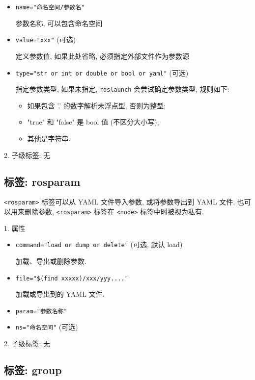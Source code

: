 \documentclass[openany, fontset=windowsold]{ctexbook}
\theoremstyle{kaiti}
\theoremstyle{normal}
\begin{document}
\begin{itemize}
  \item \verb|name="命名空间/参数名"|

  参数名称, 可以包含命名空间

  \item \verb|value="xxx"| (可选)

  定义参数值, 如果此处省略, 必须指定外部文件作为参数源

  \item \verb|type="str or int or double or bool or yaml"| (可选)

  指定参数类型, 如果未指定, \verb|roslaunch| 会尝试确定参数类型, 规则如下:
  \begin{itemize}
    \item 如果包含 '.' 的数字解析未浮点型, 否则为整型;
    \item "true" 和 "false" 是 bool 值 (不区分大小写);
    \item 其他是字符串.
  \end{itemize}
\end{itemize}

2. 子级标签: 无

\subsection{标签: rosparam}

\verb|<rosparam>| 标签可以从 YAML 文件导入参数, 或将参数导出到 YAML 文件, 也可以用来删除参数, \verb|<rosparam>| 标签在 \verb|<node>| 标签中时被视为私有.

1. 属性

\begin{itemize}
  \item \verb|command="load or dump or delete"| (可选, 默认 load)

  加载、导出或删除参数.

  \item \verb|file="$(find xxxxx)/xxx/yyy...."|

  加载或导出到的 YAML 文件.

  \item \verb|param="参数名称"|

  \item \verb|ns="命名空间"| (可选)
\end{itemize}

2. 子级标签: 无

\subsection{标签: group}
\end{document}
